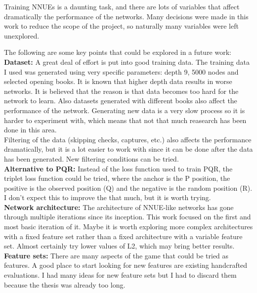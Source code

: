 Training NNUEs is a daunting task, and there are lots of variables that affect dramatically the performance of the networks. Many decisions were made in this work to reduce the scope of the project, so naturally many variables were left unexplored.

The following are some key points that could be explored in a future work: \\

\textbf{Dataset:} A great deal of effort is put into good training data. The training data I used was generated using very specific parameters: depth 9, 5000 nodes and selected opening books. It is known that higher depth data results in worse networks. It is believed that the reason is that data becomes too hard for the network to learn. Also datasets generated with different books also affect the performance of the network.  Generating new data is a very slow process so it is harder to experiment with, which means that not that much reasearch has been done in this area. \\
Filtering of the data (skipping checks, captures, etc.) also affects the performance dramatically, but it is a lot easier to work with since it can be done after the data has been generated. New filtering conditions can be tried. \\

\textbf{Alternative to PQR:} Instead of the loss function used to train PQR, the triplet loss function could be tried, where the anchor is the P position, the positive is the observed position (Q) and the negative is the random position (R). I don't expect this to improve the that much, but it is worth trying. \\

\textbf{Network architecture:} The architecture of NNUE-like networks has gone through multiple iterations since its inception. This work focused on the first and most basic iteration of it. Maybe it is worth exploring more complex architectures with a fixed feature set rather than a fixed architecture with a variable feature set.
Almost certainly try lower values of L2, which may bring better results. \\

\textbf{Feature sets:} There are many aspects of the game that could be tried as features. A good place to start looking for new features are existing handcrafted evaluations. I had many ideas for new feature sets but I had to discard them because the thesis was already too long.
